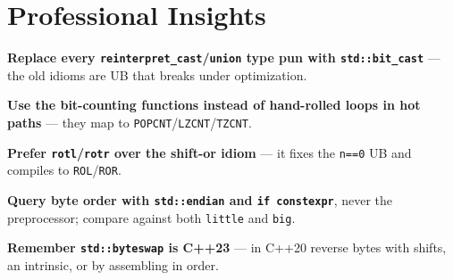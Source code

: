 \section{Professional Insights}
\label{sec:c20-bit-insights}

\textbf{Replace every \texttt{reinterpret\_cast}/\texttt{union} type pun with \texttt{std::bit\_cast}} --- the old idioms are UB that breaks under optimization.

\textbf{Use the bit-counting functions instead of hand-rolled loops in hot paths} --- they map to \texttt{POPCNT}/\texttt{LZCNT}/\texttt{TZCNT}.

\textbf{Prefer \texttt{rotl}/\texttt{rotr} over the shift-or idiom} --- it fixes the \texttt{n==0} UB and compiles to \texttt{ROL}/\texttt{ROR}.

\textbf{Query byte order with \texttt{std::endian} and \texttt{if constexpr}}, never the preprocessor; compare against both \texttt{little} and \texttt{big}.

\textbf{Remember \texttt{std::byteswap} is C++23} --- in C++20 reverse bytes with shifts, an intrinsic, or by assembling in order.
